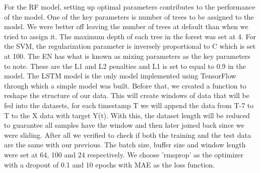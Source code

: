 \documentclass[12pt,italian, twoside]{report}
\begin{document}
\begin{enumerate}
	For the RF model, setting up optimal parameters contributes to the performance of the model. One of the key parameters is number of trees to be assigned to the model. We were better off leaving the number of trees at default than when we tried to assign it. The maximum depth of each tree in the forest was set at 4. For the SVM, the regularization parameter is inversely proportional to C which is set at 100.  The EN has what is known as mixing parameters as the key parameters to note. These are the L1 and L2 penalties and L1 is set to equal to 0.9 in the model. The LSTM model is the only model implemented using TensorFlow through which a simple model was built. Before that, we created a function to reshape the structure of our data. This will create windows of data that will be fed into the datasets, for each timestamp T we will append the data from T-7 to T to the X data with target Y(t). With this, the dataset length will be reduced to guarantee all samples have the window and then later joined back since we were sliding. After all we verified to check if both the training and the test data are the same with our previous. The batch size, buffer size and window length were set at 64, 100 and 24 respectively. We choose 'rmsprop' as the optimizer with a dropout of 0.1 and 10 epochs with MAE as the loss function.
	\end{enumerate}
\end{document}
